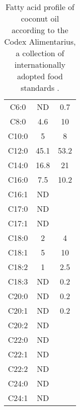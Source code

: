 \begin{table}

\caption{Fatty acid profile of coconut oil according to the Codex Alimentarius, a collection of internationally adopted food 
standards \autocite{JFAOWHOCAC2019}.}

	\label{tab:CoconutFAO}
	\centering
\begin{tabular}{c|c|c}
\toprule
	\tabhead{Fatty acid} & \tabhead{Lower} &   	\tabhead{Upper}	\\
	\midrule
C6:0	&	ND		&	0.7		\\
C8:0	&	4.6		&	10		\\
C10:0	&	5		&	8		\\
C12:0	&	45.1	&	53.2	\\
C14:0	&	16.8	&	21		\\
C16:0	&	7.5		&	10.2	\\
C16:1	&	ND		&			\\
C17:0	&	ND		&			\\
C17:1	&	ND		&			\\
C18:0	&	2		&	4		\\
C18:1	&	5		&	10		\\
C18:2	&	1		&	2.5		\\
C18:3	&	ND		&	0.2		\\
C20:0	&	ND		&	0.2		\\
C20:1	&	ND		&	0.2		\\
C20:2	&	ND		&			\\
C22:0	&	ND		&			\\
C22:1	&	ND		&			\\
C22:2	&	ND		&			\\
C24:0	&	ND		&			\\
C24:1	&	ND		&			\\
	\bottomrule
\end{tabular}
\end{table}


